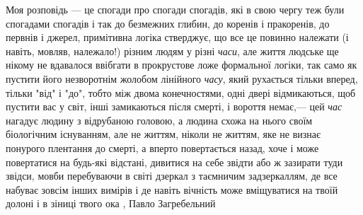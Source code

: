 Моя розповідь — це спогади про спогади спогадів, які в свою чергу теж були
спогадами спогадів і так до безмежних глибин, до коренів і пракоренів, до
первнів і джерел, примітивна логіка стверджує, що все це повинно належати (і
навіть, мовляв, належало!) різним людям у різні \emph{часи}, але життя людське ще
нікому не вдавалося ввібгати в прокрустове ложе формальної логіки, так само як
пустити його незворотнім жолобом лінійного \emph{часу}, який рухається тільки вперед,
тільки "від" і "до", тобто між двома конечностями, одні двері відмикаються, щоб
пустити вас у світ, інші замикаються після смерті, і вороття немає,— цей \emph{час}
нагадує людину з відрубаною головою, а людина схожа на нього своїм біологічним
існуванням, але не життям, ніколи не життям, яке не визнає понурого плентання
до смерті, а вперто повертається назад, хоче і може повертатися на будь-які
відстані, дивитися на себе звідти або ж зазирати туди звідси, мовби перебуваючи
в світі дзеркал з таємничим задзеркаллям, де все набуває зовсім інших вимірів і
де навіть вічність може вміщуватися на твоїй долоні і в зіниці твого ока
, Павло Загребельний 
